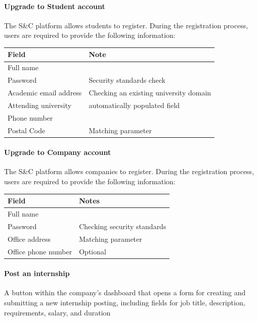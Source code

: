 \paragraph{Upgrade to Student account}
The S\&C platform allows students to register. During the registration process, users are required to provide the following information:
\begin{center}
\renewcommand{\arraystretch}{1}
\begin{tabular}{|p{5cm}|p{5cm}|}
\hline
\textbf{Field}  & \textbf{Note} \\
\hline
Full name &  \\
\hline
Password & Security standards check\\
\hline
Academic email address & Checking an existing university domain \\
\hline
Attending university & automatically populated field \\
\hline
Phone number &  \\
\hline
Postal Code & Matching parameter \\
\hline
\end{tabular}
\end{center}

\paragraph{Upgrade to Company account}
The S\&C platform allows companies to register. During the registration process, users are required to provide the following information:
\begin{center}
\renewcommand{\arraystretch}{1}
\begin{tabular}{|p{5cm}|p{5cm}|}
\hline
\textbf{Field} & \textbf{Notes} \\
\hline
Full name &  \\
\hline
Password & Checking security standards \\
\hline
Office address & Matching parameter \\
\hline
Office phone number & Optional \\
\hline
\end{tabular}
\end{center}

\paragraph{Post an internship}A button within the company's dashboard that opens a form for creating and submitting a new internship posting, including fields for job title, description, requirements, salary, and duration

